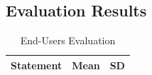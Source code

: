 
\begin{appendices}

	\begin{centerappendixtitle}
		\chapter{Evaluation Results}
		\pagebreak
		
		\begin{spacing}{1.3}
		\begin{longtable}{p{12cm}cc}	
		\caption{End-Users Evaluation} \\
		\hline
		\textbf{Statement} & \textbf{Mean} & \textbf{SD} \\
		\hline
		\endfirsthead
		

\end{longtable}
\end{spacing}
\end{centerappendixtitle}
\end{appendices}
